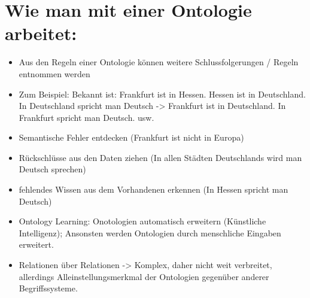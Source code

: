 \section*{Wie man mit einer Ontologie arbeitet:}
\begin{itemize}
	\item Aus den Regeln einer Ontologie können weitere Schlussfolgerungen / Regeln entnommen werden
\item	Zum Beispiel: Bekannt ist: Frankfurt ist in Hessen. Hessen ist in Deutschland. In Deutschland spricht man Deutsch -> Frankfurt ist in Deutschland. In Frankfurt spricht man Deutsch. usw.	
\item Semantische Fehler entdecken (Frankfurt ist nicht in Europa)
\item Rückschlüsse aus den Daten ziehen (In allen Städten Deutschlands wird man Deutsch sprechen)
\item fehlendes Wissen aus dem Vorhandenen erkennen (In Hessen spricht man Deutsch)
\item Ontology Learning: Onotologien automatisch erweitern (Künstliche Intelligenz); Ansonsten werden Ontologien durch menschliche Eingaben erweitert.
\item	Relationen über Relationen -> Komplex, daher nicht weit verbreitet, allerdings Alleinstellungsmerkmal der Ontologien gegenüber anderer Begriffssysteme.
\end{itemize}